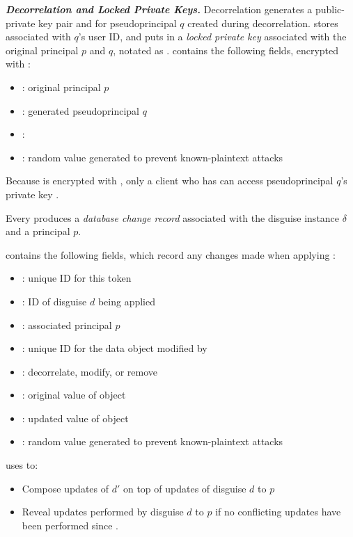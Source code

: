 \noindent\textbf{\emph{Decorrelation and Locked Private Keys.}}
Decorrelation generates a public-private key pair  and  for pseudoprincipal $q$
created during decorrelation.
\sys stores  associated with $q$'s user ID, and puts  in a \emph{locked private key}
associated with the original principal $p$ and $q$, notated as .  contains the
following fields, encrypted with :
\begin{itemize}
\item {}: original principal $p$
\item {}: generated pseudoprincipal $q$
\item {}: 
\item {}: random value generated to prevent known-plaintext attacks
\end{itemize}
\noindent Because  is encrypted with , only a client who has
 can access pseudoprincipal $q$'s private key .

Every  produces a \emph{database change record}  associated with the disguise instance $\delta$ and a
principal $p$. 

 contains the following fields, which record any changes made when applying :
%
\begin{itemize}
\item {}: unique ID for this token
\item {}: ID of disguise $d$ being applied
\item {}: associated principal $p$
\item {}: unique ID for the data object modified by 
\item {}: decorrelate, modify, or remove
\item {}: original value of object 
\item {}: updated value of object 
\item {}: random value generated to prevent known-plaintext attacks
\end{itemize}

\sys uses  to:
\begin{itemize}
    \item Compose updates of $d'$ on top of updates of disguise $d$ to $p$
    \item Reveal updates performed by disguise $d$ to $p$ if no conflicting updates have been
        performed since
.
\end{itemize}


